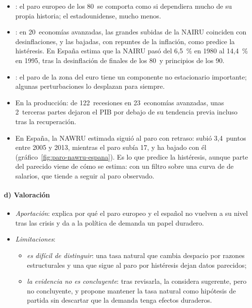 \documentclass[11pt]{article}
\begin{document}
\begin{itemize}
\item \textcite{BlanchardSummers1986Hysteresis}: el paro europeo de los 80~se comporta como si dependiera mucho de su propia historia; el estadounidense, mucho menos.
\item \textcite{Ball2009Hysteresis}: en 20~economías avanzadas, las grandes subidas de la NAIRU coinciden con desinflaciones, y las bajadas, con repuntes de la inflación, como predice la histéresis. En España estima que la NAIRU pasó del 6,5~\% en 1980 al 14,4~\% en 1995, tras la desinflación de finales de los 80~y principios de los 90.
\item \textcite{Gali2015Hysteresis}: el paro de la zona del euro tiene un componente no estacionario importante; algunas perturbaciones lo desplazan para siempre.
\item En la producción: de 122~recesiones en 23~economías avanzadas, unas 2~terceras partes dejaron el PIB por debajo de su tendencia previa incluso tras la recuperación\nocite{BlanchardCeruttiSummers2015Inflation}.
\item En España, la NAWRU estimada siguió al paro con retraso: subió 3,4~puntos entre 2005 y 2013, mientras el paro subía 17, y ha bajado con él (gráfico~\ref{fig:paro-nawru-espana}). Es lo que predice la histéresis, aunque parte del parecido viene de cómo se estima: con un filtro sobre una curva de  de salarios, que tiende a seguir al paro observado\nocite{Havik2014Potencial}.
\end{itemize}

\paragraph{d) Valoración}

\begin{itemize}
\item \emph{Aportación}: explica por qué el paro europeo y el español no vuelven a su nivel tras las crisis y da a la política de demanda un papel duradero.
\item \emph{Limitaciones}:
  \begin{itemize}
  \item \emph{es difícil de distinguir}: una tasa natural que cambia despacio por razones estructurales y una que sigue al paro por histéresis dejan datos parecidos;
  \item \emph{la evidencia no es concluyente}: tras revisarla, \textcite{Blanchard2018Natural} la considera sugerente, pero no concluyente, y propone mantener la tasa natural como hipótesis de partida sin descartar que la demanda tenga efectos duraderos.
  \end{itemize}
\end{itemize}
\end{document}
